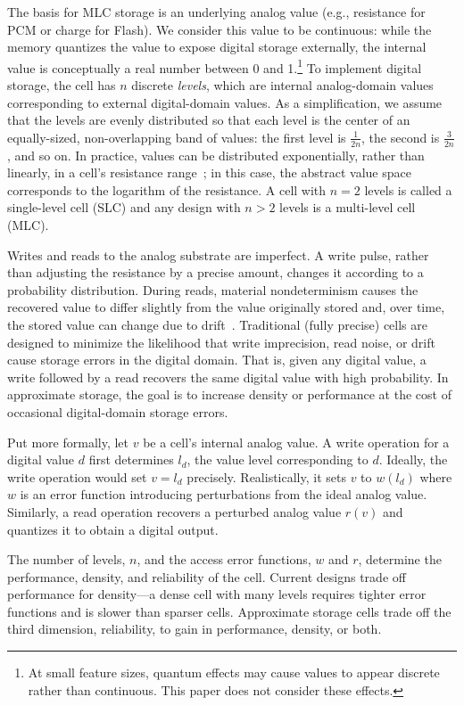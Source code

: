 \documentclass[prodmode,acmtocs]{acmsmall}
\begin{document}
The basis for MLC storage is an underlying analog value (e.g., resistance for
PCM or charge for Flash).
We consider this value to be
continuous: while the memory quantizes the value to expose digital
storage externally, the internal value is conceptually
a real number between 0 and 1.\footnote{At small feature sizes, quantum effects may
cause values to appear discrete rather than
continuous. This paper does not consider these effects.}
To implement
digital storage, the cell has $n$ discrete \emph{levels}, which are
internal analog-domain values corresponding to
external digital-domain values. As a simplification, we
assume that the levels are evenly distributed so that each level is
the center of an equally-sized, non-overlapping band of values: the
first level is $\frac{1}{2n}$, the second is $\frac{3}{2n}$, and so
on. In practice, values can be distributed exponentially, rather
    than linearly, in a cell's resistance range~\cite{mlcibm,partialreset}; in this case, the abstract value space corresponds
to the logarithm of the resistance. A cell with $n=2$ levels is
called a single-level cell (SLC) and any design with $n
> 2$ levels is a multi-level cell (MLC).

Writes and reads to the analog substrate are imperfect. A write
pulse, rather than adjusting the resistance by a precise amount,
changes it according to a probability distribution. During
reads, material nondeterminism causes the recovered value to differ
slightly from the value originally stored and, over time, the stored
value can change due to drift~\cite{wdddmlcpcm}.
Traditional (fully precise) cells are designed to minimize the
likelihood that write imprecision, read noise, or drift cause storage
errors in the digital domain. That is, given any digital value, a
write followed by a read recovers the same digital value with
high probability. In approximate storage, the goal is to increase
density or performance at the cost of occasional digital-domain
storage errors.

Put more formally, let $v$ be a cell's internal analog value. A
write operation for a digital value $d$ first determines
$l_d$, the value level corresponding to
$d$. Ideally, the write operation would set $v = l_d$ precisely.
Realistically, it sets $v$ to $w(l_d)$ where $w$ is an error
function introducing perturbations from the ideal analog value.
Similarly, a read operation recovers a perturbed analog value $r(v)$ and
quantizes it to obtain a digital output.

The number of levels, $n$, and the access error functions, $w$ and
$r$, determine the performance, density, and reliability of the cell.
Current designs trade off performance
for density---a dense cell with many levels requires tighter error
functions and is slower than sparser cells. Approximate
storage cells trade off the third dimension, reliability, to gain in
performance, density, or both.
\end{document}
